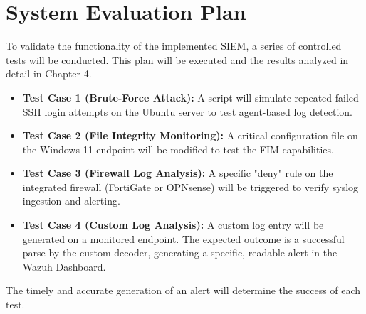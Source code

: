 \section{System Evaluation Plan}
\label{sec:evaluation}
To validate the functionality of the implemented SIEM, a series of controlled tests will be conducted. This plan will be executed and the results analyzed in detail in Chapter 4.
\begin{itemize}
    \item \textbf{Test Case 1 (Brute-Force Attack):} A script will simulate repeated failed SSH login attempts on the Ubuntu server to test agent-based log detection.
    \item \textbf{Test Case 2 (File Integrity Monitoring):} A critical configuration file on the Windows 11 endpoint will be modified to test the FIM capabilities.
    \item \textbf{Test Case 3 (Firewall Log Analysis):} A specific "deny" rule on the integrated firewall (FortiGate or OPNsense) will be triggered to verify syslog ingestion and alerting.
    \item \textbf{Test Case 4 (Custom Log Analysis):} A custom log entry will be generated on a monitored endpoint. The expected outcome is a successful parse by the custom decoder, generating a specific, readable alert in the Wazuh Dashboard.
\end{itemize}
The timely and accurate generation of an alert will determine the success of each test.



  